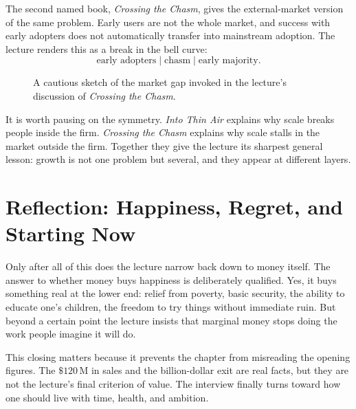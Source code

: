 The second named book, \emph{Crossing the Chasm}, gives the external-market version of the same problem. Early users are not the whole market, and success with early adopters does not automatically transfer into mainstream adoption. The lecture renders this as a break in the bell curve:
\begin{equation}
\text{early adopters}\;\big|\;\text{chasm}\;\big|\;\text{early majority}.
\end{equation}

\begin{figure}[h]
\centering
{}
\caption{A cautious sketch of the market gap invoked in the lecture's discussion of \emph{Crossing the Chasm}.}
\end{figure}

It is worth pausing on the symmetry. \emph{Into Thin Air} explains why scale breaks people inside the firm. \emph{Crossing the Chasm} explains why scale stalls in the market outside the firm. Together they give the lecture its sharpest general lesson: growth is not one problem but several, and they appear at different layers.

\section{Reflection: Happiness, Regret, and Starting Now}

Only after all of this does the lecture narrow back down to money itself. The answer to whether money buys happiness is deliberately qualified. Yes, it buys something real at the lower end: relief from poverty, basic security, the ability to educate one's children, the freedom to try things without immediate ruin. But beyond a certain point the lecture insists that marginal money stops doing the work people imagine it will do.

This closing matters because it prevents the chapter from misreading the opening figures. The \(\$120\,\mathrm{M}\) in sales and the billion-dollar exit are real facts, but they are not the lecture's final criterion of value. The interview finally turns toward how one should live with time, health, and ambition.

